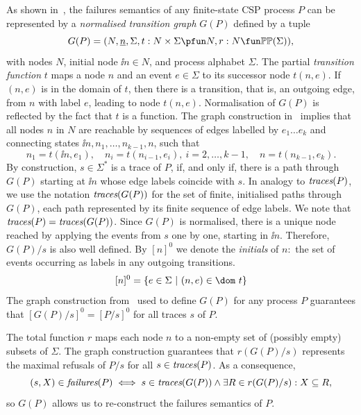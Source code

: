 As shown in~\cite{Roscoe:1994:chapter}, the failures semantics of any
finite-state CSP process $P$ can be represented by a \emph{normalised
transition graph} $G(P)$ defined by a tuple
$$
G(P) = ( N, \ii n, \Sigma, t : N\times\Sigma \pfun N, r : N \fun \mathbb{P}\mathbb{P}(\Sigma)),
$$
with nodes $N$, initial node $\ii n\in N$, and process alphabet $\Sigma$. The
partial \emph{transition function} $t$ maps a node $n$ and an event
$e\in\Sigma$ to its successor node $t(n,e)$. If $(n,e)$ is in the domain of
$t$, then there is a transition, that is, an outgoing edge, from $n$ with
label $e$, leading to node $t(n,e)$. Normalisation of $G(P)$ is reflected by
the fact that $t$ is a function. The graph construction
in~\cite{Roscoe:1994:chapter} implies that all nodes $n$ in $N$ are
reachable by sequences of edges labelled by $e_1\dots e_k$ and connecting
states $\ii n,n_1,\dots,n_{k-1},n$, such that
\[
n_1 = t(\ii n,e_1), \quad n_i = t(n_{i-1},e_i),\ i = 2,\dots,k-1,\quad
n= t(n_{k-1},e_k).
\]
%
By construction, $s\in\Sigma^*$ is a trace of $P$, if, and only if, there is
a path through $G(P)$ starting  at $\ii n$ whose edge labels coincide with
$s$. In analogy to $\text{\it traces}(P)$, we use the notation $\text{\it traces}(G(P))$ for the set of
finite, initialised paths through $G(P)$, each path represented by its finite
sequence of edge labels. We note that $\text{\it traces}(P) = \text{\it traces}(G(P))$. Since $G(P)$ is
normalised, there is a unique node reached by applying the events from $s$
one by one, starting in $\ii n$. Therefore, $G(P)/s$  is also well defined.
By $[n]^0$ we denote the \emph{initials} of $n$:~the set of events occurring
as labels in any outgoing transitions.
$$
[n]^0 = \{ e\in\Sigma~|~(n,e)\in\dom~t \}
$$
The graph construction from~\cite{Roscoe:1994:chapter} used to define
$G(P)$ for any process $P$ guarantees that $[G(P)/s]^0 = [P/s]^0$ for all
traces $s$ of $P$.

The total function $r$ maps each node $n$ to a non-empty set of  (possibly
empty) subsets of $\Sigma$. The graph construction guarantees that
$r(G(P)/s)$ represents the maximal refusals of $P/s$ for all $s\in\text{\it traces}(P)$.
As a consequence,
\begin{equation}\label{eq:refsAndR}
(s,X)\in\text{\it failures}(P) \iff s\in\text{\it traces}(G(P)) \wedge \exists R\in r(G(P)/s): X\subseteq R,
\end{equation}
so $G(P)$ allows us to re-construct the failures semantics of $P$.


